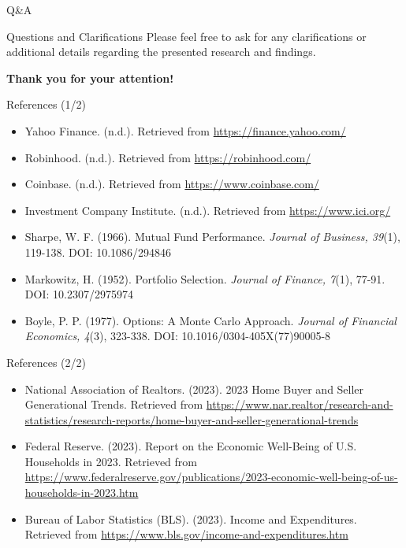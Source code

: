 \documentclass{beamer}
\begin{document}
\begin{frame}{Q\&A}
    \begin{block}{Questions and Clarifications}
        Please feel free to ask for any clarifications or additional details regarding the presented research and findings.
    \end{block}
    \vspace{1cm}
    \begin{center}
        \Large \textbf{Thank you for your attention!}
    \end{center}
\end{frame}


\begin{frame}{References (1/2)}
    \begin{itemize}
        \item Yahoo Finance. (n.d.). Retrieved from \url{https://finance.yahoo.com/}
        \item Robinhood. (n.d.). Retrieved from \url{https://robinhood.com/}
        \item Coinbase. (n.d.). Retrieved from \url{https://www.coinbase.com/}
        \item Investment Company Institute. (n.d.). Retrieved from \url{https://www.ici.org/}
    \end{itemize}
    \begin{itemize}
        \item Sharpe, W. F. (1966). Mutual Fund Performance. \textit{Journal of Business, 39}(1), 119-138. DOI: 10.1086/294846
        \item Markowitz, H. (1952). Portfolio Selection. \textit{Journal of Finance, 7}(1), 77-91. DOI: 10.2307/2975974
        \item Boyle, P. P. (1977). Options: A Monte Carlo Approach. \textit{Journal of Financial Economics, 4}(3), 323-338. DOI: 10.1016/0304-405X(77)90005-8
    \end{itemize}
\end{frame}

\begin{frame}{References (2/2)}
    \begin{itemize}
        \item National Association of Realtors. (2023). 2023 Home Buyer and Seller Generational Trends. Retrieved from \url{https://www.nar.realtor/research-and-statistics/research-reports/home-buyer-and-seller-generational-trends}
        \item Federal Reserve. (2023). Report on the Economic Well-Being of U.S. Households in 2023. Retrieved from \url{https://www.federalreserve.gov/publications/2023-economic-well-being-of-us-households-in-2023.htm}
        \item Bureau of Labor Statistics (BLS). (2023). Income and Expenditures. Retrieved from \url{https://www.bls.gov/income-and-expenditures.htm}
    \end{itemize}
\end{frame}
\end{document}
